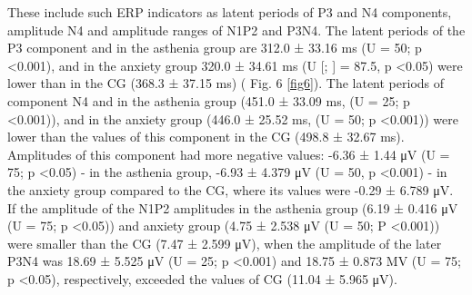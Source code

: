 \documentclass[twocolumn]{article}
\begin{document}
\par These include such ERP indicators as latent periods of P3 and N4 components, amplitude N4 and amplitude ranges of N1P2 and P3N4. The latent periods of the P3 component and in the asthenia group are 312.0 ± 33.16 ms (U = 50; p <0.001), and in the anxiety group 320.0 ± 34.61 ms (U [\cite{bib15}; \cite{bib20}] = 87.5, p <0.05) were lower than in the CG (368.3 ± 37.15 ms) ( Fig. 6 \ref{fig6}). The latent periods of component N4 and in the asthenia group (451.0 ± 33.09 ms, (U = 25; p <0.001)), and in the anxiety group (446.0 ± 25.52 ms, (U = 50; p <0.001)) were lower than the values of this component in the CG (498.8 ± 32.67 ms). Amplitudes of this component had more negative values: -6.36 ± 1.44 μV (U = 75; p <0.05) - in the asthenia group, -6.93 ± 4.379 μV (U = 50, p <0.001) - in the anxiety group compared to the CG, where its values were -0.29 ± 6.789 μV. If the amplitude of the N1P2 amplitudes in the asthenia group (6.19 ± 0.416 μV (U = 75; p <0.05)) and anxiety group (4.75 ± 2.538 μV (U = 50; P <0.001)) were smaller than the CG (7.47 ± 2.599 μV), when the amplitude of the later P3N4 was 18.69 ± 5.525 μV (U = 25; p <0.001) and 18.75 ± 0.873 ΜV (U = 75; p <0.05), respectively, exceeded the values of CG (11.04 ± 5.965 μV). 
\end{document}
